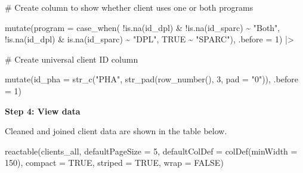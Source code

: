 \documentclass[
  letterpaper,
  DIV=11,
  numbers=noendperiod]{scrartcl}
\newenvironment{Shaded}{\begin{snugshade}}{\end{snugshade}}
\newcommand{\AttributeTok}[1]{\textcolor[rgb]{0.40,0.45,0.13}{#1}}
\newcommand{\CommentTok}[1]{\textcolor[rgb]{0.37,0.37,0.37}{#1}}
\newcommand{\ConstantTok}[1]{\textcolor[rgb]{0.56,0.35,0.01}{#1}}
\newcommand{\DecValTok}[1]{\textcolor[rgb]{0.68,0.00,0.00}{#1}}
\newcommand{\FunctionTok}[1]{\textcolor[rgb]{0.28,0.35,0.67}{#1}}
\newcommand{\NormalTok}[1]{\textcolor[rgb]{0.00,0.23,0.31}{#1}}
\newcommand{\SpecialCharTok}[1]{\textcolor[rgb]{0.37,0.37,0.37}{#1}}
\newcommand{\StringTok}[1]{\textcolor[rgb]{0.13,0.47,0.30}{#1}}
\begin{document}
\begin{Shaded}
\begin{Highlighting}[]
  \CommentTok{\# Create column to show whether client uses one or both programs}
  
  \FunctionTok{mutate}\NormalTok{(}\AttributeTok{program =} \FunctionTok{case\_when}\NormalTok{(}
      \SpecialCharTok{!}\FunctionTok{is.na}\NormalTok{(id\_dpl) }\SpecialCharTok{\&} \SpecialCharTok{!}\FunctionTok{is.na}\NormalTok{(id\_sparc) }\SpecialCharTok{\textasciitilde{}} \StringTok{"Both"}\NormalTok{,}
      \SpecialCharTok{!}\FunctionTok{is.na}\NormalTok{(id\_dpl) }\SpecialCharTok{\&} \FunctionTok{is.na}\NormalTok{(id\_sparc) }\SpecialCharTok{\textasciitilde{}} \StringTok{"DPL"}\NormalTok{,}
      \ConstantTok{TRUE} \SpecialCharTok{\textasciitilde{}} \StringTok{"SPARC"}\NormalTok{),}
    \AttributeTok{.before =} \DecValTok{1}\NormalTok{) }\SpecialCharTok{|\textgreater{}} 
  
  \CommentTok{\# Create universal client ID column}
  
  \FunctionTok{mutate}\NormalTok{(}\AttributeTok{id\_pha =} \FunctionTok{str\_c}\NormalTok{(}\StringTok{"PHA"}\NormalTok{, }\FunctionTok{str\_pad}\NormalTok{(}\FunctionTok{row\_number}\NormalTok{(), }\DecValTok{3}\NormalTok{, }\AttributeTok{pad =} \StringTok{"0"}\NormalTok{)),}
         \AttributeTok{.before =} \DecValTok{1}\NormalTok{)}
\end{Highlighting}
\end{Shaded}

\textbf{Step 4: View data}

Cleaned and joined client data are shown in the table below.

\begin{Shaded}
\begin{Highlighting}[]
\FunctionTok{reactable}\NormalTok{(clients\_all,}
          \AttributeTok{defaultPageSize =} \DecValTok{5}\NormalTok{,}
          \AttributeTok{defaultColDef =} \FunctionTok{colDef}\NormalTok{(}\AttributeTok{minWidth =} \DecValTok{150}\NormalTok{),}
          \AttributeTok{compact =} \ConstantTok{TRUE}\NormalTok{,}
          \AttributeTok{striped =} \ConstantTok{TRUE}\NormalTok{,}
          \AttributeTok{wrap =} \ConstantTok{FALSE}\NormalTok{)}
\end{Highlighting}
\end{Shaded}
\end{document}
